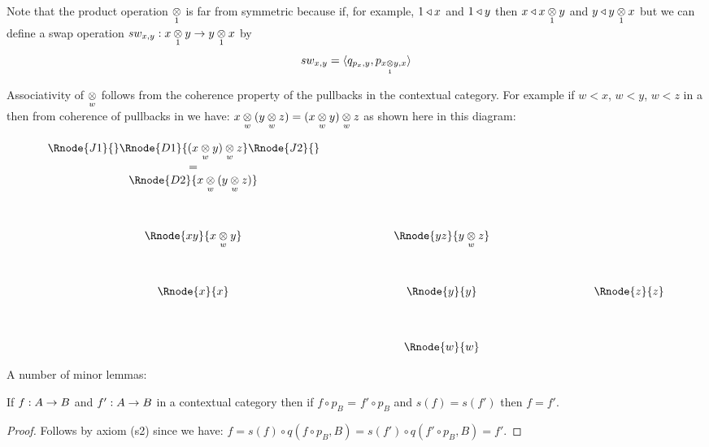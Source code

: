 \note 
Note that the product operation $\crossx{}{}{1}$ is far from symmetric 
because if, for example, $1 \base x$ and $1 \base y$ then $x \base \crossx{x}{y}{1}$ and $y \base \crossx{y}{x}{1}$ but we can define 
a swap operation $sw_{x,y} : \crossx{x}{y}{1} \morph \crossx{y}{x}{1}$ by
\begin{equation}
sw_{x,y} = \tuple{q_{p_x,y}, p_{\crossx{x}{y}{1},x}}
\end{equation}

\note
Associativity of $\crossx{}{}w$  follows from the coherence property of the pullbacks in the contextual category. 
For example if $w < x$, $w < y$, $w < z$ in a \ccat then from coherence of pullbacks in \ccat we have:
$\crossx{x}{(\crossx{y}{z}{w})}{w} = \crossx{(\crossx{x}{y}{w})}{z}{w}$ as shown here in this diagram:
 
\begin{displaymath}
\begin{array}{cp{1.0cm}cp{1.0cm}c}
\Rnode{J1}{}\Rnode{D1} {\crossx{(\crossx{x}{y}{w})}{z}{w}}\Rnode{J2}{} \ \ \ \ \   &&  &&  \\ 
= && && \\
\Rnode{D2} {\crossx{x}{(\crossx{y}{z}{w})}{w}}    &&  &&                        \\ [1.3cm]
\Rnode{xy}{\crossx{x}{y}{w}}&& \Rnode{yz}{\crossx{y}{z}{w}} &&                      \\[1.3cm]
\Rnode{x}{x}&& \Rnode{y}{y} && \ \ \ \ \ \ \ \ \ \ \ \ \ \Rnode{z}{z}                                        \\[1.3cm]
             && \Rnode{w}{w} &&                                                     
\end{array}
\end{displaymath}




\note A number of minor lemmas:

\begin{lemma}
\label{footandstactic}
If $f: A \morph B$ and $f':A \morph B$ in a contextual category \catcw then if 
$f \circ p_B$ = $f' \circ p_B$ and $s(f) = s(f')$ then $f=f'$.
\end{lemma}
\begin{proof}
Follows by axiom (s2) since we have:
$f = s(f) \circ q(f \circ p_B,B)  = s(f') \circ q(f' \circ p_B,B) = f'$.
\end{proof}

